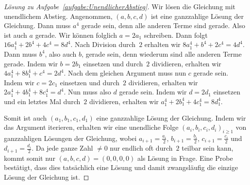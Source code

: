 \begin{proof}[Lösung zu Aufgabe~\ref{aufgabe:UnendlicherAbstieg}]
	Wir lösen die Gleichung mit unendlichem Abstieg. Angenommen, $(a,b,c,d)$ ist eine ganzzahlige Lösung der Gleichung. Dann muss $a^4$ gerade sein, denn alle anderen Terme sind gerade. Also ist auch $a$ gerade. Wir können folglich $a=2a_1$ schreiben. Dann folgt $16a_1^4+2b^4+4c^4=8d^4$. Nach Division durch~$2$ erhalten wir $8a_1^4+b^4+2c^4=4d^4$. Dann muss $b^4$, also auch $b$, gerade sein, denn wiederum sind alle anderen Terme gerade. Indem wir $b=2b_1$ einsetzen und durch~$2$ dividieren, erhalten wir $4a_1^4+8b_1^4+c^4=2d^4$. Nach dem gleichen Argument muss nun $c$ gerade sein. Indem wir $c=2c_1$ einsetzen und durch~$2$ dividieren, erhalten wir $2a_1^4+4b_1^4+8c_1^4=d^4$. Nun muss also $d$ gerade sein. Indem wir $d=2d_1$ einsetzen und ein letztes Mal durch~$2$ dividieren, erhalten wir $a_1^4+2b_1^4+4c_1^4=8d_1^4$.
	
	Somit ist auch $(a_1,b_1,c_1,d_1)$ eine ganzzahlige Lösung der Gleichung. Indem wir das Argument iterieren, erhalten wir eine unendliche Folge $(a_i,b_i,c_i,d_i)_{i\geqslant 1}$ von ganzzahligen Lösungen der Gleichung, wobei $a_{i+1}=\frac{a_i}{2}$, $b_{i+1}=\frac{b_i}{2}$, $c_{i+1}=\frac{c_i}{2}$ und $d_{i+1}=\frac{d_i}{2}$. Da jede ganze Zahl $\neq 0$ nur endlich oft durch~$2$ teilbar sein kann, kommt somit nur $(a,b,c,d)=(0,0,0,0)$ als Lösung in Frage. Eine Probe bestätigt, dass dies tatsächlich eine Lösung und damit zwangsläufig die einzige Lösung der Gleichung ist.
\end{proof}

